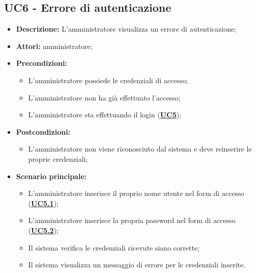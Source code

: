 \documentclass[5pt]{article}
\begin{document}
\subsection{UC6 - Errore di autenticazione}
\label{sec:UC6}
\begin{itemize}
    \item \textbf{Descrizione:} L’amministratore visualizza un errore di autenticazione;
    \item \textbf{Attori:} amministratore;
    \item \textbf{Precondizioni:} 
    \begin{itemize}
        \item L’amministratore possiede le credenziali di accesso;
        \item L’amministratore non ha già effettuato l’accesso;
        \item L’amministratore sta effettuando il login (\hyperref[sec:UC5]{\textbf{UC5}});
    \end{itemize}
    \item \textbf{Postcondizioni:}
    \begin{itemize}
        \item L’amministratore non viene riconosciuto dal sistema e deve reinserire le proprie credenziali;
    \end{itemize}
    \item \textbf{Scenario principale:} 
    \begin{itemize}
        \item L’amministratore inserisce il proprio nome utente nel form di accesso (\hyperref[sec:UC5.1]{\textbf{UC5.1}});
        \item L’amministratore inserisce la propria password nel form di accesso (\hyperref[sec:UC5.2]{\textbf{UC5.2}});
        \item Il sistema verifica le credenziali ricevute siano corrette;
        \item Il sistema visualizza un messaggio di errore per le credenziali inserite.
    \end{itemize}
\end{itemize}
\end{document}
